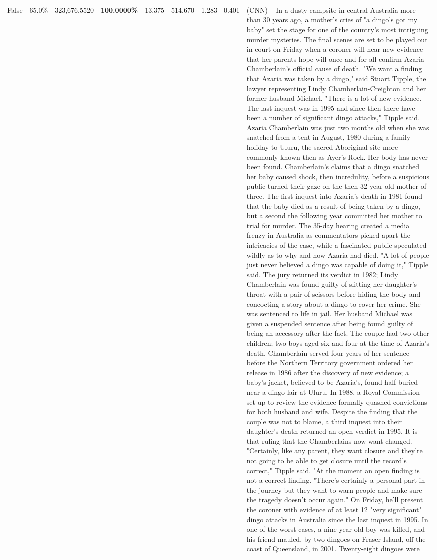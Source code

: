 \begin{table}[H]
\begin{tabular}{lllrlllll}
False & 65.0\% & 323,676.5520 & \bfseries \color{red} 100.0000\% & 13.375 & 514.670 & 1,283 & 0.401 & (CNN) -- In a dusty campsite in central Australia more than 30 years ago, a mother's cries of "a dingo's got my baby" set the stage for one of the country's most intriguing murder mysteries. The final scenes are set to be played out in court on Friday when a coroner will hear new evidence that her parents hope will once and for all confirm Azaria Chamberlain's official cause of death. "We want a finding that Azaria was taken by a dingo," said Stuart Tipple, the lawyer representing Lindy Chamberlain-Creighton and her former husband Michael. "There is a lot of new evidence. The last inquest was in 1995 and since then there have been a number of significant dingo attacks," Tipple said. Azaria Chamberlain was just two months old when she was snatched from a tent in August, 1980 during a family holiday to Uluru, the sacred Aboriginal site more commonly known then as Ayer's Rock. Her body has never been found. Chamberlain's claims that a dingo snatched her baby caused shock, then incredulity, before a suspicious public turned their gaze on the then 32-year-old mother-of-three. The first inquest into Azaria's death in 1981 found that the baby died as a result of being taken by a dingo, but a second the following year committed her mother to trial for murder. The 35-day hearing created a media frenzy in Australia as commentators picked apart the intricacies of the case, while a fascinated public speculated wildly as to why and how Azaria had died. "A lot of people just never believed a dingo was capable of doing it," Tipple said. The jury returned its verdict in 1982; Lindy Chamberlain was found guilty of slitting her daughter's throat with a pair of scissors before hiding the body and concocting a story about a dingo to cover her crime. She was sentenced to life in jail. Her husband Michael was given a suspended sentence after being found guilty of being an accessory after the fact. The couple had two other children; two boys aged six and four at the time of Azaria's death. Chamberlain served four years of her sentence before the Northern Territory government ordered her release in 1986 after the discovery of new evidence; a baby's jacket, believed to be Azaria's, found half-buried near a dingo lair at Uluru. In 1988, a Royal Commission set up to review the evidence formally quashed convictions for both husband and wife. Despite the finding that the couple was not to blame, a third inquest into their daughter's death returned an open verdict in 1995. It is that ruling that the Chamberlains now want changed. "Certainly, like any parent, they want closure and they're not going to be able to get closure until the record's correct," Tipple said. "At the moment an open finding is not a correct finding. "There's certainly a personal part in the journey but they want to warn people and make sure the tragedy doesn't occur again." On Friday, he'll present the coroner with evidence of at least 12 "very significant" dingo attacks in Australia since the last inquest in 1995. In one of the worst cases, a nine-year-old boy was killed, and his friend mauled, by two dingoes on Fraser Island, off the coast of Queensland, in 2001. Twenty-eight dingoes were 
\end{tabular}
\end{table}
